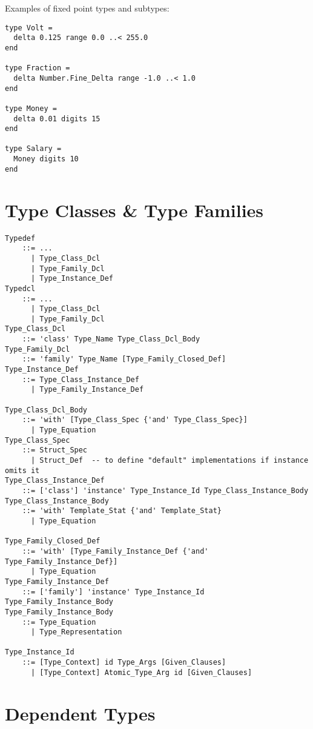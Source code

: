 \example Examples of fixed point types and subtypes:
\begin{lstlisting}
type Volt = 
  delta 0.125 range 0.0 ..< 255.0 
end 

type Fraction = 
  delta Number.Fine_Delta range -1.0 ..< 1.0 
end 

type Money = 
  delta 0.01 digits 15 
end 

type Salary = 
  Money digits 10 
end 
\end{lstlisting}





\section[Type Classes \& Type Families]{Type Classes \& Type Families}
\label{sec:type-classes}

\grammar\begin{lstlisting}
Typedef
    ::= ...
      | Type_Class_Dcl
      | Type_Family_Dcl
      | Type_Instance_Def
Typedcl
    ::= ...
      | Type_Class_Dcl
      | Type_Family_Dcl
Type_Class_Dcl
    ::= 'class' Type_Name Type_Class_Dcl_Body
Type_Family_Dcl
    ::= 'family' Type_Name [Type_Family_Closed_Def]
Type_Instance_Def
    ::= Type_Class_Instance_Def
      | Type_Family_Instance_Def
      
Type_Class_Dcl_Body 
    ::= 'with' [Type_Class_Spec {'and' Type_Class_Spec}]
      | Type_Equation
Type_Class_Spec
    ::= Struct_Spec
      | Struct_Def  -- to define "default" implementations if instance omits it
Type_Class_Instance_Def
    ::= ['class'] 'instance' Type_Instance_Id Type_Class_Instance_Body
Type_Class_Instance_Body 
    ::= 'with' Template_Stat {'and' Template_Stat}
      | Type_Equation
      
Type_Family_Closed_Def
    ::= 'with' [Type_Family_Instance_Def {'and' Type_Family_Instance_Def}]
      | Type_Equation
Type_Family_Instance_Def
    ::= ['family'] 'instance' Type_Instance_Id Type_Family_Instance_Body
Type_Family_Instance_Body
    ::= Type_Equation
      | Type_Representation

Type_Instance_Id
    ::= [Type_Context] id Type_Args [Given_Clauses]
      | [Type_Context] Atomic_Type_Arg id [Given_Clauses]
\end{lstlisting}






\section{Dependent Types}
\label{sec:dependent-types}

